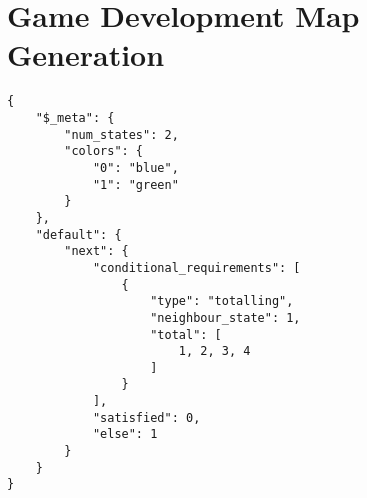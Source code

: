 \section{Game Development Map Generation}
\label{appendix:gamedevmap_rules}
\begin{verbatim}
{
    "$_meta": {
        "num_states": 2,
        "colors": {
            "0": "blue",
            "1": "green"
        }
    },
    "default": {
        "next": {
            "conditional_requirements": [
                {
                    "type": "totalling",
                    "neighbour_state": 1,
                    "total": [
                        1, 2, 3, 4
                    ]
                }
            ],
            "satisfied": 0,
            "else": 1
        }
    }
}
  
\end{verbatim}